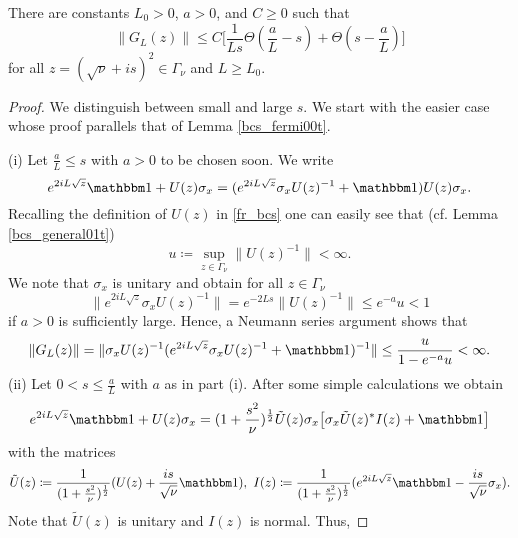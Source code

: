 \begin{lemma}\label{bcs_fermi01t}
There are constants $L_0>0$, $a>0$, and $C\geq 0$ such that
\begin{equation*}
  \| G_L(z) \| \leq C \big[ \frac{1}{Ls}\Theta(\frac{a}{L}-s) + \Theta(s-\frac{a}{L}) \big]
\end{equation*}
for all $z=(\sqrt{\nu}+is)^2\in\Gamma_\nu$ and $L\geq L_0$.
\end{lemma}
\begin{proof}
We distinguish between small and large $s$. We start with the easier case whose proof parallels that of Lemma \ref{bcs_fermi00t}. 

(i) 
Let $\frac{a}{L}\leq s$ with $a>0$ to be chosen soon. We write
\begin{equation*}
  e^{2iL\sqrt{z}}\id + U(z)\sigma_x = ( e^{2iL\sqrt{z}}\sigma_x U(z)^{-1} + \id ) U(z)\sigma_x .
\end{equation*}
Recalling the definition of $U(z)$ in \eqref{fr_bcs} one can easily see that (cf. Lemma \ref{bcs_general01t})
\begin{equation*}
  u \coloneqq \sup_{z\in\Gamma_\nu} \|U(z)^{-1}\|<\infty .
\end{equation*}
We note that $\sigma_x$ is unitary and obtain for all $z\in\Gamma_\nu$
\begin{equation*}
  \| e^{2iL\sqrt{z}} \sigma_x U(z)^{-1} \| = e^{-2Ls} \|U(z)^{-1}\| \leq e^{-a} u  < 1
\end{equation*}
if $a>0$ is sufficiently large. Hence, a Neumann series argument shows that
\begin{equation*}
  \|G_L(z)\| = \|\sigma_x U(z)^{-1}( e^{2iL\sqrt{z}} \sigma_x U(z)^{-1} + \id )^{-1}\| 
                \leq \frac{u}{1-e^{-a} u} < \infty .
\end{equation*}
(ii) 
Let $0 < s\leq \frac{a}{L}$ with $a$ as in part (i). After some simple calculations we obtain
\begin{equation*}
  e^{2iL\sqrt{z}}\id + U(z)\sigma_x
     = (1+\frac{s^2}{\nu})^{\frac{1}{2}} \tilde U(z)\sigma_x  \big[\sigma_x \tilde U(z)^* I(z) + \id \big]
\end{equation*}
with the matrices
\begin{equation*}
  \tilde U(z) \coloneqq \frac{1}{(1+\frac{s^2}{\nu})^{\frac{1}{2}}} ( U(z) + \frac{is}{\sqrt{\nu}} \id ) , \
  I(z)\coloneqq \frac{1}{(1+\frac{s^2}{\nu})^{\frac{1}{2}}} ( e^{2iL\sqrt{z}}\id - \frac{is}{\sqrt{\nu}}\sigma_x ) .
\end{equation*}
Note that $\tilde U(z)$ is unitary and $I(z)$ is normal. Thus,

\end{proof}
